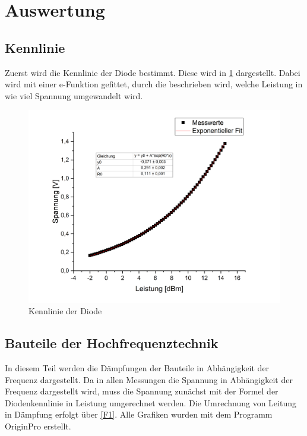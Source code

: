 \section{Auswertung}
\subsection{Kennlinie}
Zuerst wird die Kennlinie der Diode bestimmt. Diese wird in \cref{fuck_scidavis} dargestellt. Dabei wird mit einer e-Funktion gefittet, durch die beschrieben wird, welche Leistung in wie viel Spannung umgewandelt wird. 

\begin{figure}[h]
	\centering
	\includegraphics[scale=0.4]{fuck_scidavis.PNG}
	\caption{Kennlinie der Diode}
	\label{fuck_scidavis}
\end{figure}

\subsection{Bauteile der Hochfrequenztechnik}
In diesem Teil werden die Dämpfungen der Bauteile in Abhängigkeit der Frequenz dargestellt. Da in allen Messungen die Spannung in Abhängigkeit der Frequenz dargestellt wird, muss die Spannung zunächst mit der Formel der Diodenkennlinie in Leistung umgerechnet werden. Die Umrechnung von Leitung in Dämpfung erfolgt über \cref{F1}. Alle Grafiken wurden mit dem Programm OriginPro erstellt.
